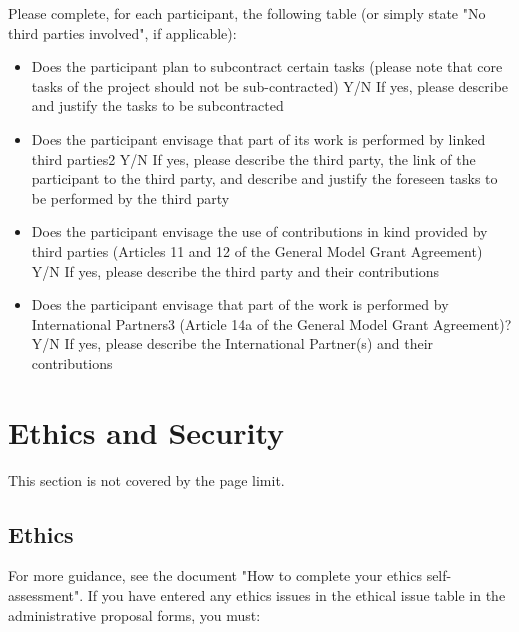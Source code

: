 \documentclass[12pt, a4paper]{article} %
\begin{document}
 
Please complete, for each participant, the following table (or simply state "No third parties involved", if applicable):
\begin{itemize}
\item Does the participant plan to subcontract certain tasks  (please note that core tasks of the project should not be sub-contracted)
  Y/N
  If yes, please describe and justify the tasks to be subcontracted
\item Does the participant envisage that part of its work is performed by linked third parties2
Y/N
If yes, please describe the third party, the link of the participant to the third party, and describe and justify the foreseen tasks to be performed by the third party

\item Does the participant envisage the use of contributions in kind provided by third parties (Articles 11 and 12 of the General Model Grant Agreement)
Y/N
If yes, please describe the third party and their contributions

\item Does the participant envisage that part of the work is performed by International Partners3 (Article 14a of the General Model Grant Agreement)?
Y/N
If yes, please describe the International Partner(s) and their contributions
\end{itemize}


\section{Ethics and Security}

 This section is not covered by the page limit.

\subsection{Ethics}

 For more guidance, see the document "How to complete your ethics self-assessment".
If you have entered any ethics issues in the ethical issue table in the administrative proposal forms, you must:
\end{document}
